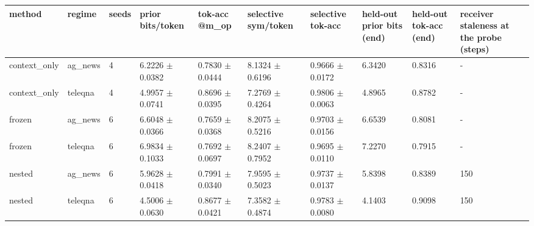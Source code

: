 \begin{tabular}{llllllllll}
\hline
method & regime & seeds & prior bits/token & tok-acc @m\_op & selective sym/token & selective tok-acc & held-out prior bits (end) & held-out tok-acc (end) & receiver staleness at the probe (steps) \\
\hline
context\_only & ag\_news & 4 & 6.2226 $\pm$ 0.0382 & 0.7830 $\pm$ 0.0444 & 8.1324 $\pm$ 0.6196 & 0.9666 $\pm$ 0.0172 & 6.3420 & 0.8316 & - \\
context\_only & teleqna & 4 & 4.9957 $\pm$ 0.0741 & 0.8696 $\pm$ 0.0395 & 7.2769 $\pm$ 0.4264 & 0.9806 $\pm$ 0.0063 & 4.8965 & 0.8782 & - \\
frozen & ag\_news & 6 & 6.6048 $\pm$ 0.0366 & 0.7659 $\pm$ 0.0368 & 8.2075 $\pm$ 0.5216 & 0.9703 $\pm$ 0.0156 & 6.6539 & 0.8081 & - \\
frozen & teleqna & 6 & 6.9834 $\pm$ 0.1033 & 0.7692 $\pm$ 0.0697 & 8.2407 $\pm$ 0.7952 & 0.9695 $\pm$ 0.0110 & 7.2270 & 0.7915 & - \\
nested & ag\_news & 6 & 5.9628 $\pm$ 0.0418 & 0.7991 $\pm$ 0.0340 & 7.9595 $\pm$ 0.5023 & 0.9737 $\pm$ 0.0137 & 5.8398 & 0.8389 & 150 \\
nested & teleqna & 6 & 4.5006 $\pm$ 0.0630 & 0.8677 $\pm$ 0.0421 & 7.3582 $\pm$ 0.4874 & 0.9783 $\pm$ 0.0080 & 4.1403 & 0.9098 & 150 \\
\hline
\end{tabular}
